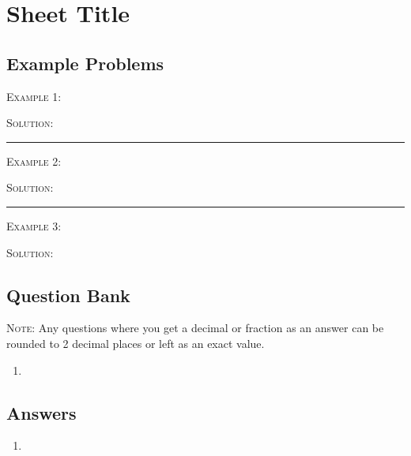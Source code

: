 \documentclass[a4paper,12pt]{article}
\begin{document}
\large
\section*{Sheet Title}

\subsection*{Example Problems}

\textsc{Example 1}: 

\textsc{Solution}: 

\vspace{3mm}
\hrule
\vspace{3mm}

\textsc{Example 2}: 

\textsc{Solution}: 

\vspace{3mm}
\hrule
\vspace{3mm}

\textsc{Example 3}: 

\textsc{Solution}: 

\newpage
\subsection*{Question Bank}

\textsc{Note}: Any questions where you get a decimal or fraction 
as an answer can be rounded to 2 decimal places or left as 
an exact value.

\begin{enumerate}
\item 
\end{enumerate}

\newpage
\subsection*{Answers}

\begin{enumerate}
\item 
\end{enumerate}
\end{document}
